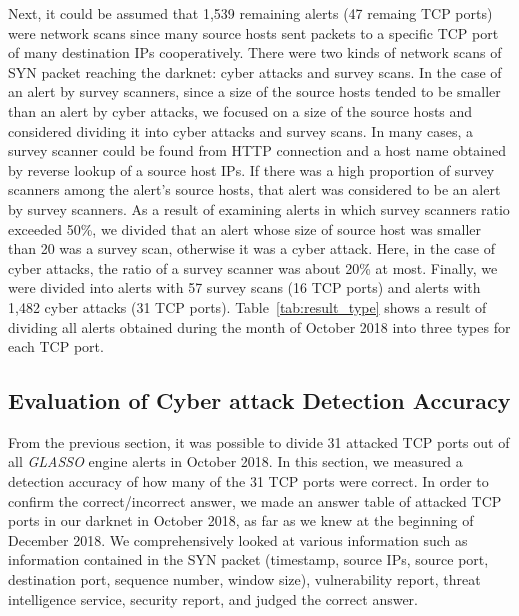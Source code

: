 \documentclass[conference]{IEEEtran}
\begin{document}
Next, it could be assumed that 1,539 remaining alerts (47 remaing TCP ports) were network scans since many source hosts sent packets to a specific TCP port of many destination IPs cooperatively.
There were two kinds of network scans of SYN packet reaching the darknet: cyber attacks and survey scans.
In the case of an alert by survey scanners, since a size of the source hosts tended to be smaller than an alert by cyber attacks, we focused on a size of the source hosts and considered dividing it into cyber attacks and survey scans.
In many cases, a survey scanner could be found from HTTP connection and a host name obtained by reverse lookup of a source host IPs.
If there was a high proportion of survey scanners among the alert's source hosts, that alert was considered to be an alert by survey scanners.
As a result of examining alerts in which survey scanners ratio exceeded 50\%, we divided that an alert whose size of source host was smaller than 20 was a survey scan, otherwise it was a cyber attack.
Here, in the case of cyber attacks, the ratio of a survey scanner was about 20\% at most.
Finally, we were divided into alerts with 57 survey scans (16 TCP ports) and alerts with 1,482 cyber attacks (31 TCP ports).
Table~\ref{tab:result_type} shows a result of dividing all alerts obtained during the month of October 2018 into three types for each TCP port.







\subsection{Evaluation of Cyber attack Detection Accuracy}
From the previous section, it was possible to divide 31 attacked TCP ports out of all {\it GLASSO} engine alerts in October 2018.
In this section, we measured a detection accuracy of how many of the 31 TCP ports were correct.
In order to confirm the correct/incorrect answer, we made an answer table of attacked TCP ports in our darknet in October 2018, as far as we knew at the beginning of December 2018.
We comprehensively looked at various information such as information contained in the SYN packet (timestamp, source IPs, source port, destination port, sequence number, window size), vulnerability report, threat intelligence service, security report, and judged the correct answer.
\end{document}
